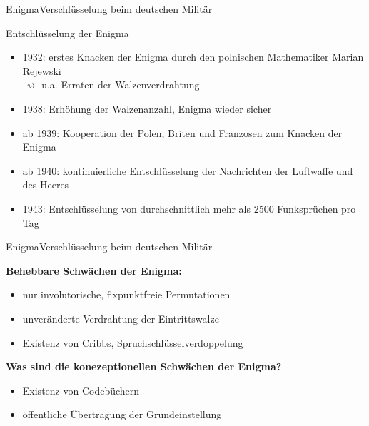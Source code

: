 \documentclass{beamer}
\theoremstyle{plain}
\begin{document}
   \begin{frame}{Enigma}{Verschlüsselung beim deutschen Militär} 
    \begin{block}{Entschlüsselung der Enigma}
     \begin{itemize}[<+->]
      \item 1932: erstes Knacken der Enigma durch den polnischen Mathematiker Marian Rejewski\\
      $\rightsquigarrow$ u.a. Erraten der Walzenverdrahtung
      \item 1938: Erhöhung der Walzenanzahl, Enigma wieder sicher
      \item ab 1939: Kooperation der Polen, Briten und Franzosen zum Knacken der Enigma
      \item ab 1940: kontinuierliche Entschlüsselung der Nachrichten der Luftwaffe und des Heeres
      \item 1943: Entschlüsselung von durchschnittlich mehr als 2500 Funksprüchen pro Tag
     \end{itemize}
    \end{block}
   \end{frame}

   \begin{frame}{Enigma}{Verschlüsselung beim deutschen Militär} 
  
  \textbf{Behebbare Schwächen der Enigma:} \pause
     \vspace{0.5cm}
     
  \begin{block}{}
   \begin{itemize}
    \item nur involutorische, fixpunktfreie Permutationen
    \item unveränderte Verdrahtung der Eintrittswalze
    \item Existenz von Cribbs, Spruchschlüsselverdoppelung
   \end{itemize}
  \end{block}\pause

   \vspace{0.5cm}
   \textbf{Was sind die konezeptionellen Schwächen der Enigma?} \pause
   
   \vspace{0.5cm}
   \begin{alertblock}{}
    \begin{itemize}
	\item Existenz von Codebüchern
	\item öffentliche Übertragung der Grundeinstellung
    \end{itemize}

    \end{alertblock}
  
\end{frame}
\end{document}
